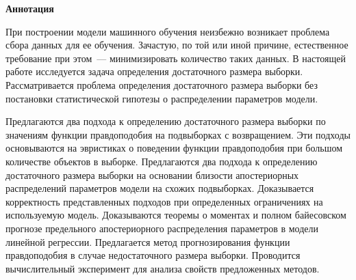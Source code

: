 \begin{center}
    \Large{\textbf{Аннотация}}
\end{center}

При построении модели машинного обучения неизбежно возникает проблема сбора данных для ее обучения.
Зачастую, по той или иной причине, естественное требование при этом~--- минимизировать количество таких данных.
В настоящей работе исследуется задача определения достаточного размера выборки. 
Рассматривается проблема определения достаточного размера выборки без постановки статистической гипотезы о распределении параметров модели. 

Предлагаются два подхода к определению достаточного размера выборки по значениям функции правдоподобия на подвыборках с возвращением. 
Эти подходы основываются на эвристиках о поведении функции правдоподобия при большом количестве объектов в выборке. 
Предлагаются два подхода к определению достаточного размера выборки на основании близости апостериорных распределений параметров модели на схожих подвыборках. 
Доказывается корректность представленных подходов при определенных ограничениях на используемую модель. 
Доказываются теоремы о моментах и полном байесовском прогнозе предельного апостериорного распределения параметров в модели линейной регрессии.
Предлагается метод прогнозирования функции правдоподобия в случае недостаточного размера выборки. 
Проводится вычислительный эксперимент для анализа свойств предложенных методов.